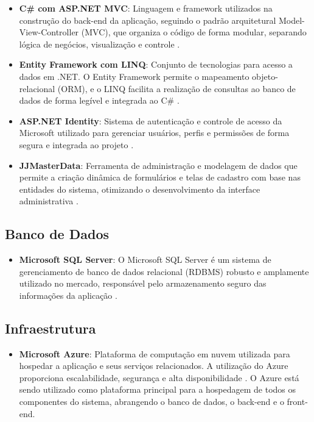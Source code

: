 \documentclass[
	12pt,				%
	openany,			%
	twoside,			%
	a4paper,			%
	english,			%
	brazil				%
	]{abntex2}
\begin{document}
\begin{itemize}

  \item \textbf{C\# com ASP.NET MVC}: Linguagem e framework utilizados na construção do back-end da aplicação, seguindo o padrão arquitetural Model-View-Controller (MVC), que organiza o código de forma modular, separando lógica de negócios, visualização e controle \cite{AspNet2025}.

  \item \textbf{Entity Framework com LINQ}: Conjunto de tecnologias para acesso a dados em .NET. O Entity Framework permite o mapeamento objeto-relacional (ORM), e o LINQ facilita a realização de consultas ao banco de dados de forma legível e integrada ao C\# \cite{EfCore}.

  \item \textbf{ASP.NET Identity}: Sistema de autenticação e controle de acesso da Microsoft utilizado para gerenciar usuários, perfis e permissões de forma segura e integrada ao projeto \cite{Identity}.

  \item \textbf{JJMasterData}: Ferramenta de administração e modelagem de dados que permite a criação dinâmica de formulários e telas de cadastro com base nas entidades do sistema, otimizando o desenvolvimento da interface administrativa \cite{JJMasterdata}.

\end{itemize}

\subsection{Banco de Dados}

\begin{itemize}
    \item \textbf{Microsoft SQL Server}: O Microsoft SQL Server é um sistema de gerenciamento de banco de dados relacional (RDBMS) robusto e amplamente utilizado no mercado, responsável pelo armazenamento seguro das informações da aplicação \cite{SqlServer2025}.


\end{itemize}

\subsection{Infraestrutura}

\begin{itemize}
    \item \textbf{Microsoft Azure}: Plataforma de computação em nuvem utilizada para hospedar a aplicação e seus serviços relacionados. A utilização do Azure proporciona escalabilidade, segurança e alta disponibilidade \cite{Azure2025}. O Azure está sendo utilizado como plataforma principal para a hospedagem de todos os componentes do sistema, abrangendo o banco de dados, o back-end e o front-end.
\end{itemize}
\end{document}
